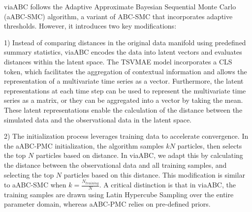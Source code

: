 \documentclass[12pt]{article} %
\begin{document}
viaABC follows the Adaptive Approximate Bayesian Sequential Monte Carlo (aABC-SMC) algorithm, a variant of ABC-SMC that incorporates adaptive thresholds. However, it introduces two key modifications: 

1) Instead of comparing distances in the original data manifold using predefined summary statistics, viaABC encodes the data into latent vectors and evaluates distances within the latent space. The TSVMAE model incorporates a CLS token, which facilitates the aggregation of contextual information and allows the representation of a multivariate time series as a vector. Furthermore, the latent representations at each time step can be used to represent the multivariate time series as a matrix, or they can be aggregated into a vector by taking the mean. These latent representations enable the calculation of the distance between the simulated data and the observational data in the latent space.

2) The initialization process leverages training data to accelerate convergence. In the aABC-PMC initialization, the algorithm samples $kN$ particles, then selects the top $N$ particles based on distance. In viaABC, we adapt this by calculating the distance between the observational data and all training samples, and selecting the top $N$ particles based on this distance. This modification is similar to aABC-SMC when $k = \frac{N_{training}}{N}$. A critical distinction is that in viaABC, the training samples are drawn using Latin Hypercube Sampling over the entire parameter domain, whereas aABC-PMC relies on pre-defined priors.

\end{document}
